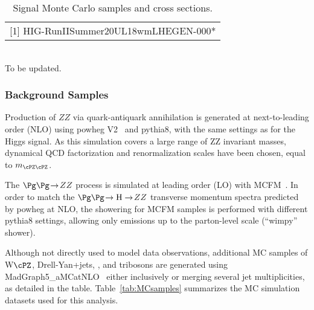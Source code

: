 \begin{table}
\begin{scriptsize}
\begin{tabular}{|l|l|r|}
 \hline
 \multicolumn{3}{l}{[1] HIG-RunIISummer20UL18wmLHEGEN-000*} \\  %
 \end{tabular}
 \caption{Signal Monte Carlo samples and cross sections.}
  \label{tab:SignalSamples}
\end{scriptsize}
\end{table}

 \label{madgraph5} \\
To be updated.


\subsubsection{Background Samples}

Production of $ZZ$ via quark-antiquark annihilation is generated at
next-to-leading order (NLO) using {\sc powheg V2}~\cite{Nason:2013ydw}
and {\sc pythia8}, with 
the same settings as for the Higgs signal. As this simulation covers a large
range of ZZ invariant masses, dynamical QCD factorization and renormalization
scales have been chosen, equal to $m_{\cPZ\cPZ}$. 

The $\Pg\Pg \! \to \! ZZ$ process is simulated at leading order (LO) 
with MCFM~\cite{MCFM,Campbell:2013una}. In order to match the 
$\Pg\Pg \! \to \mathrm{H} \to \! ZZ$ transverse momentum spectra predicted 
by {\sc powheg} at NLO, the showering for MCFM samples is performed with 
different {\sc pythia8} settings, allowing only emissions up to the parton-level scale
(``wimpy'' shower).

Although not directly used to model data observations, additional 
MC samples of W$\cPZ$, Drell-Yan+jets, \ttbar, and tribosons are
generated using {\sc MadGraph5\_aMCatNLO}~\cite{Alwall:2014hca} either
inclusively or merging several jet multiplicities, as detailed in the table.
Table~\ref{tab:MCsamples} summarizes the MC simulation datasets used for this analysis. 


